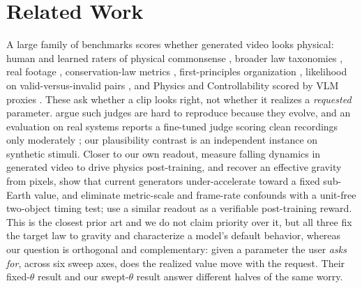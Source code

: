 \documentclass[10pt,twocolumn,letterpaper]{article}
\begin{document}
\section{Related Work}
\label{sec:related}

A large family of benchmarks scores whether generated video looks physical:
human and learned raters of physical commonsense
\citep{bansal2024videophy,bansal2025videophy2}, broader law taxonomies
\citep{meng2024phygenbench,phyworldbench2025}, real footage
\citep{motamed2025physicsiq}, conservation-law metrics
\citep{zhang2025morpheus}, first-principles organization
\citep{t2vphysbench2025}, likelihood on valid-versus-invalid pairs
\citep{likephys2025}, and Physics and Controllability scored by VLM proxies
\citep{vbench2_2025,applepi2026}. These ask whether a clip looks right, not
whether it realizes a \emph{requested} parameter. \citet{phyground2026} argue
such judges are hard to reproduce because they evolve, and an evaluation on
real systems reports a fine-tuned judge scoring clean recordings only
moderately \citep{newtonianreal2026}; our plausibility contrast is an
independent instance on synthetic stimuli. Closer to our own readout,
\citet{li2025pisa} measure falling dynamics in generated video to drive
physics post-training, and \citet{thozhiyoor2026gravity} recover an effective
gravity from pixels, show that current generators under-accelerate toward a
fixed sub-Earth value, and eliminate metric-scale and frame-rate confounds
with a unit-free two-object timing test; \citet{gravityrewards2025} use a
similar readout as a verifiable post-training reward. This is the closest
prior art and we do not claim priority over it, but all three fix the target
law to gravity and characterize a model's default behavior, whereas our
question is orthogonal and complementary: given a parameter the user
\emph{asks for}, across six sweep axes, does the realized value move with the
request. Their fixed-$\theta$ result and our swept-$\theta$ result answer
different halves of the same worry.
\end{document}
